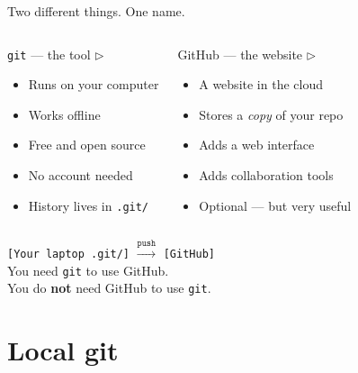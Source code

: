 \documentclass[aspectratio=169]{beamer}
\begin{document}
\begin{frame}{Two different things. One name.}
    \begin{columns}
            \begin{block}{\texttt{git} --- the tool $\triangleright$}
                \begin{itemize}
                    \item Runs on your computer
                    \item Works offline
                    \item Free and open source
                    \item No account needed
                    \item History lives in \texttt{.git/}
                \end{itemize}
            \end{block}
            \begin{block}{GitHub --- the website $\triangleright$}
                \begin{itemize}
                    \item A website in the cloud
                    \item Stores a \textit{copy} of your repo
                    \item Adds a web interface
                    \item Adds collaboration tools
                    \item Optional --- but very useful
                \end{itemize}
            \end{block}
    \end{columns}
    \vspace{1em}
    \pause
    \centering
    \texttt{[Your laptop \;\; .git/]}
    \quad $\overset{\texttt{push}}{\longrightarrow}$ \quad
    \texttt{[GitHub]}\\[6pt]
    \small
    You need \texttt{git} to use GitHub.\\
    You do \textbf{not} need GitHub to use \texttt{git}.
\end{frame}

\section{Local git}
\end{document}
